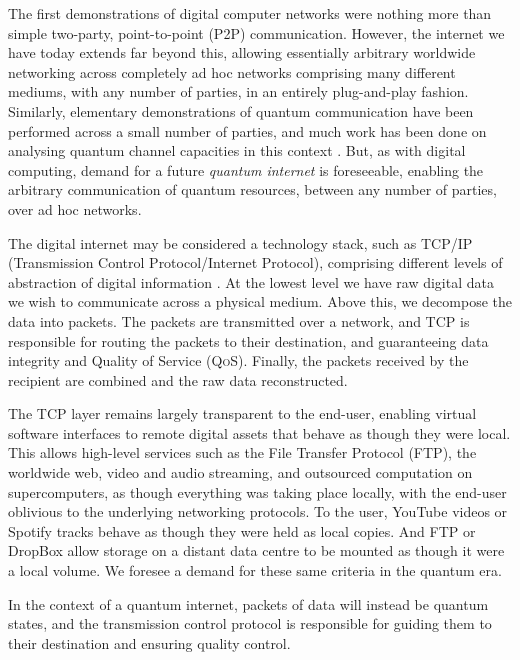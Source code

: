 \documentclass[aps,rmp,twocolumn,amsmath,amssymb,nofootinbib,superscriptaddress,longbibliography,floatfix,table-of-contents,eqsecnum]{revtex4-1}
\begin{document}
The first demonstrations of digital computer networks were nothing more than simple two-party, point-to-point (P2P) communication. However, the internet we have today extends far beyond this, allowing essentially arbitrary worldwide networking across completely ad hoc networks comprising many different mediums, with any number of parties, in an entirely plug-and-play fashion. Similarly, elementary demonstrations of quantum communication have been performed across a small number of parties, and much work has been done on analysing quantum channel capacities in this context \cite{??? channel_capacity}. But, as with digital computing, demand for a future \textit{quantum internet} is foreseeable, enabling the arbitrary communication of quantum resources, between any number of parties, over ad hoc networks.

The digital internet may be considered a technology stack, such as TCP/IP (Transmission Control Protocol/Internet Protocol), comprising different levels of abstraction of digital information \cite{bib:TanenbaumNet}. At the lowest level we have raw digital data we wish to communicate across a physical medium. Above this, we decompose the data into packets. The packets are transmitted over a network, and TCP is responsible for routing the packets to their destination, and guaranteeing data integrity and Quality of Service (\textsc{QoS}). Finally, the packets received by the recipient are combined and the raw data reconstructed.

The TCP layer remains largely transparent to the end-user, enabling virtual software interfaces to remote digital assets that behave as though they were local. This allows high-level services such as the File Transfer Protocol (FTP), the worldwide web, video and audio streaming, and outsourced computation on supercomputers, as though everything was taking place locally, with the end-user oblivious to the underlying networking protocols. To the user, YouTube videos or Spotify tracks behave as though they were held as local copies. And FTP or DropBox allow storage on a distant data centre to be mounted as though it were a local volume. We foresee a demand for these same criteria in the quantum era.

In the context of a quantum internet, packets of data will instead be quantum states, and the transmission control protocol is responsible for guiding them to their destination and ensuring quality control.
\end{document}
